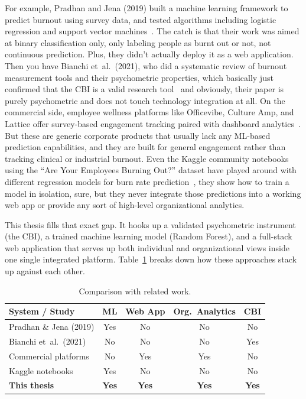\documentclass[12pt,a4paper]{article}
\begin{document}
For example, Pradhan and Jena (2019) built a machine learning framework to predict burnout using survey data, and tested algorithms including logistic regression and support vector machines~\cite{pradhan2019}. The catch is that their work was aimed at binary classification only, only labeling people as burnt out or not, not continuous prediction. Plus, they didn't actually deploy it as a web application. Then you have Bianchi et~al.\ (2021), who did a systematic review of burnout measurement tools and their psychometric properties, which basically just confirmed that the CBI is a valid research tool~\cite{bianchi2021} and obviously, their paper is purely psychometric and does not touch technology integration at all. On the commercial side, employee wellness platforms like Officevibe, Culture Amp, and Lattice offer survey-based engagement tracking paired with dashboard analytics~\cite{cultureamp2024}. But these are generic corporate products that usually lack any ML-based prediction capabilities, and they are built for general engagement rather than tracking clinical or industrial burnout. Even the Kaggle community notebooks using the ``Are Your Employees Burning Out?'' dataset have played around with different regression models for burn rate prediction~\cite{kaggle2021}, they show how to train a model in isolation, sure, but they never integrate those predictions into a working web app or provide any sort of high-level organizational analytics.

This thesis fills that exact gap. It hooks up a validated psychometric instrument (the CBI), a trained machine learning model (Random Forest), and a full-stack web application that serves up both individual and organizational views inside one single integrated platform. Table~\ref{tab:related-comparison} breaks down how these approaches stack up against each other.

\begin{table}[H]
  \centering
  \singlespacing
  \caption{Comparison with related work.}
  \label{tab:related-comparison}
  \begin{tabular}{@{}lcccc@{}}
    \toprule
    \textbf{System / Study}
      & \textbf{ML}
      & \textbf{Web App}
      & \textbf{Org.\ Analytics}
      & \textbf{CBI} \\
    \midrule
    Pradhan \& Jena (2019) & Yes & No  & No  & No  \\
    Bianchi et~al.\ (2021) & No  & No  & No  & Yes \\
    Commercial platforms   & No  & Yes & Yes & No  \\
    Kaggle notebooks       & Yes & No  & No  & No  \\
    \textbf{This thesis}   & \textbf{Yes} & \textbf{Yes} & \textbf{Yes} & \textbf{Yes} \\
    \bottomrule
  \end{tabular}
\end{table}
\end{document}
